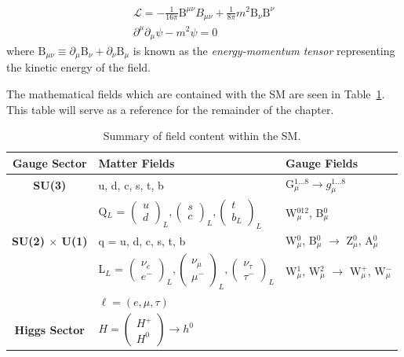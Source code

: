 \begin{equation}
\begin{array}{l}
\mathcal{L} = -\frac{1}{16\pi} \mathrm{B}^{\mu\nu}B_{\mu\nu} + \frac{1}{8\pi}m^{2}\mathrm{B}_{\nu}\mathrm{B}^{\nu}\\
\partial^{\mu} \partial_{\mu} \psi - m^{2} \psi = 0
\end{array}
\end{equation}
where $\mathrm{B}_{\mu\nu} \equiv \partial_{\mu}\mathrm{B}_{\nu} + \partial_{\nu}\mathrm{B}_{\mu}$ is known as the \textit{energy-momentum tensor} representing the kinetic energy of the field.

The mathematical fields which are contained with the SM are seen in Table~\ref{tab:sm}. This table will serve as a reference for the remainder of the chapter.

\begin{table}
\caption{Summary of field content within the SM.}
\centering
\begin{tabular}{c|ll}
\hline\hline
Gauge Sector & Matter Fields & Gauge Fields \\
\hline
\textbf{SU(3)} & u, d, c, s, t, b & G$_{\mu}^{1...8} \rightarrow g_{\mu}^{1...8} $ \\
\hline
 & Q$_{L}$ = $\begin{pmatrix} u \\ d \end{pmatrix}_{L}, \begin{pmatrix} s \\ c \end{pmatrix}_{L}, \begin{pmatrix} t \\ b_{L} \end{pmatrix}_{L} $ & W$^{012}_{\mu}$, B$^{0}_{\mu}$ \\
\textbf{SU(2) $\times$ U(1)} & q = u, d, c, s, t, b & W$_{\mu}^{0}$, B$_{\mu}^{0}$ $\rightarrow$ Z$^{0}_{\mu}$, A$^{0}_{\mu}$\\
  & L$_{L}$ = $\begin{pmatrix} \nu_{e} \\ e^{-} \end{pmatrix}_{L} , \begin{pmatrix} \nu_{\mu} \\ \mu^{-} \end{pmatrix}_{L} , \begin{pmatrix} \nu_{\tau} \\ \tau^{-}\end{pmatrix}_{L} $ & W$_{\mu}^{1}$, W$^{2}_{\mu}$ $\rightarrow$ W$_{\mu}^{+}$, W$_{\mu}^{-}$\\
  & $\ell = (e, \mu, \tau)$ & \\
  \hline
\textbf{Higgs Sector} & $H = \begin{pmatrix} H^{+} \\ H^{0} \end{pmatrix} \rightarrow h^{0}$ & \\
  \hline\hline
\end{tabular}
\label{tab:sm}
\end{table}

